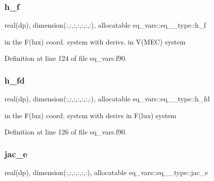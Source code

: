 \mbox{\label{structeq__vars_1_1eq__2__type_a46e78cc3ec0be1ea9db664d9bdf5a214}} 
\subsubsection{\texorpdfstring{h\+\_\+f}{h\_f}}
{\footnotesize\ttfamily real(dp), dimension(\+:,\+:,\+:,\+:,\+:,\+:,\+:), allocatable eq\+\_\+vars\+::eq\+\_\+\_\+type\+::h\+\_\+f}



in the F(lux) coord. system with derivs. in V(\+M\+E\+C) system 



Definition at line 124 of file eq\+\_\+vars.\+f90.

\mbox{\label{structeq__vars_1_1eq__2__type_a88d96d8a7aef70d21b1b7d03ff32486c}} 
\subsubsection{\texorpdfstring{h\+\_\+fd}{h\_fd}}
{\footnotesize\ttfamily real(dp), dimension(\+:,\+:,\+:,\+:,\+:,\+:,\+:), allocatable eq\+\_\+vars\+::eq\+\_\+\_\+type\+::h\+\_\+fd}



in the F(lux) coord. system with derivs in F(lux) system 



Definition at line 126 of file eq\+\_\+vars.\+f90.

\mbox{\label{structeq__vars_1_1eq__2__type_a5f712048cde053a9d2bcbf94ef2ce7ee}} 
\subsubsection{\texorpdfstring{jac\+\_\+e}{jac\_e}}
{\footnotesize\ttfamily real(dp), dimension(\+:,\+:,\+:,\+:,\+:,\+:), allocatable eq\+\_\+vars\+::eq\+\_\+\_\+type\+::jac\+\_\+e}



